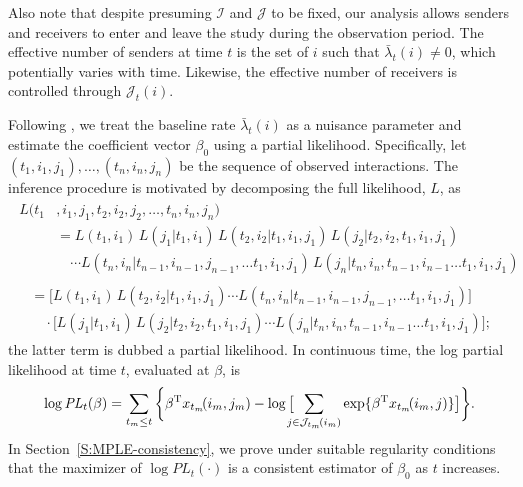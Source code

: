 \documentclass[final]{statsoc}
\begin{document}
Also note that despite presuming $\mathcal{I}$ and $\mathcal{J}$ to be fixed,
our analysis
allows senders and receivers to enter and leave the study during the
observation period.  The effective number of senders at time $t$ is the
set of $i$ such that $\bar \lambda_t(i) \neq 0$, which potentially varies
with time.  Likewise, the effective number of receivers is controlled through
$\mathcal{J}_t(i)$.

Following \citet{cox1975partial}, we treat the baseline rate
$\bar \lambda_t(i)$ as a nuisance parameter and estimate the coefficient
vector $\beta_0$ using a partial likelihood.  Specifically, let
$(t_1, i_1, j_1), \ldots, (t_n, i_n, j_n)$ be the sequence of observed
interactions.  The inference procedure is motivated by decomposing
the full likelihood, $L$, as
\begin{align*}
    \begin{split}
    L(t_1&, i_1, j_1, t_2, i_2, j_2, \ldots, t_n, i_n, j_n) \\
        &=
            L(t_1, i_1)
            \, L(j_1 | t_1, i_1)
            \, L(t_2, i_2 | t_1, i_1, j_1)
            \, L(j_2 | t_2, i_2, t_1, i_1, j_1) \\
        &\quad \cdots
            L(t_n, i_n | t_{n-1}, i_{n-1}, j_{n-1}, \ldots t_1, i_1, j_1)
            \, L(j_n | t_n, i_n, t_{n-1}, i_{n-1} \ldots t_1, i_1, j_1)
    \end{split} \\
    \begin{split}
        &=
            \Big[
                L(t_1, i_1)
                \, L(t_2, i_2 | t_1, i_1, j_1)
                \cdots
                L(t_n, i_n | t_{n-1}, i_{n-1}, j_{n-1}, \ldots t_1, i_1, j_1)
            \Big] \\
        &\quad
            \cdot
            \Big[
                L(j_1 | t_1, i_1)
                \, L(j_2 | t_2, i_2, t_1, i_1, j_1)
                \cdots
                L(j_n | t_n, i_n, t_{n-1}, i_{n-1} \ldots t_1, i_1, j_1)
            \Big];
    \end{split}
\end{align*}
the latter term is dubbed a partial likelihood.  In continuous time,
the log partial likelihood at time $t$, evaluated at $\beta$, is
\begin{equation}\label{E:log-pl}
    \log
    \mathit{PL}_t(\beta)
        =
        \sum_{t_m \leq t}
        \bigg\{
            \beta^{\mathrm{T}} x_{t_m}\!(i_m, j_m)
            -
            \log\big[
                \!\!\!\!
                \sum_{j \in \mathcal{J}_{t_m}\!(i_m)}
                    \exp\{ \beta^{\mathrm{T}} x_{t_m}\!(i_m, j)\}
            \big]
        \bigg\}.
\end{equation}
In Section~\ref{S:MPLE-consistency}, we prove under suitable regularity
conditions that the maximizer of $\log \mathit{PL}_t(\cdot)$ is a
consistent estimator of $\beta_0$ as $t$ increases.
\end{document}
